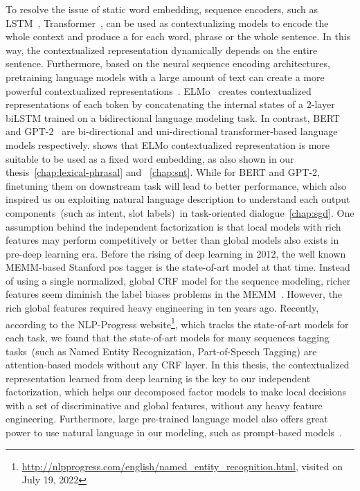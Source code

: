To resolve the issue of static word embedding, sequence encoders, such
as LSTM~\citep{hochreiter97lstm}, Transformer~\citep{NIPS2017_7181},
can be used as contextualizing models to encode the whole context and
produce a  for each word, phrase or
the whole sentence. In this way, the contextualized representation
dynamically depends on the entire sentence. Furthermore, based on the
neural sequence encoding architectures, pretraining language models
with a large amount of text can create a more powerful contextualized
representations~\citep{ethayarajh2019contextual}. ELMo~\cite{elmo}
creates contextualized representations of each token by concatenating
the internal states of a 2-layer biLSTM trained on a bidirectional
language modeling task. In contrast, BERT~\citep{devlin2019bert} and
GPT-2~\citep{radford2018improving} are bi-directional and
uni-directional transformer-based language models
respectively. \citet{peters2019tune} shows that ELMo contextualized
representation is more suitable to be used as a fixed word embedding,
as also shown in our thesis~\autoref{chap:lexical-phrasal} and
~\autoref{chap:snt}. While for BERT and GPT-2, finetuning them on
downstream task will lead to better performance, which also inspired
us on exploiting natural language description to understand each
output components~(such as intent, slot labels)~in task-oriented
dialogue~\autoref{chap:sgd}.  One assumption behind the independent
factorization is that local models with rich features may perform
competitively or better than global models also exists in pre-deep
learning era. Before the rising of deep learning in 2012, the well
known MEMM-based Stanford pos tagger is the state-of-art model at that
time. Instead of using a single normalized, global CRF model for the
sequence modeling, richer features seem diminish the label biases
problems in the
MEMM~\citep{toutanvoa2000enriching,toutanova2003feature}. However, the
rich global features required heavy engineering in ten years ago.
Recently, according to the NLP-Progress
website\footnote{\url{http://nlpprogress.com/english/named_entity_recognition.html},
  visited on July 19, 2022}, which tracks the state-of-art models for
each task, we found that the state-of-art models for many sequences
tagging tasks~(such as Named Entity Recognization, Part-of-Speech
Tagging) are attention-based models without any CRF layer. In this
thesis, the contextualized representation learned from deep learning
is the key to our independent factorization, which helps our
decomposed factor models to make local decisions with a set of
discriminative and global features, without any heavy feature
engineering. Furthermore, large pre-trained language model also offers
great power to use natural language in our modeling, such as
prompt-based models~\citep{shin2020autoprompt,liu2021pre}.

